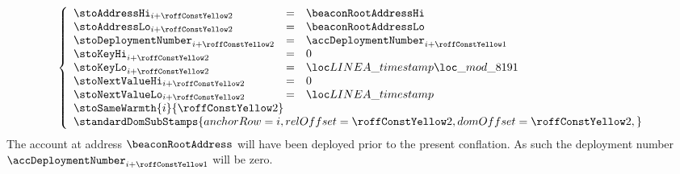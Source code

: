 \item[\underline{\underline{Storing the \inst{TIMESTAMP} in the state:}}]
	\[
		\left\{ \begin{array}{lclr}
			\stoAddressHi        _{i + \roffTxSkipSysiBeaconRootSystemContractStorageSetTimestamp} & = & \beaconRootAddressHi          \\
			\stoAddressLo        _{i + \roffTxSkipSysiBeaconRootSystemContractStorageSetTimestamp} & = & \beaconRootAddressLo          \\
			\stoDeploymentNumber _{i + \roffTxSkipSysiBeaconRootSystemContractStorageSetTimestamp} & = & \accDeploymentNumber          _{i + \roffTxSkipSysiBeaconRootSystemContractAccount} \\
			\stoKeyHi            _{i + \roffTxSkipSysiBeaconRootSystemContractStorageSetTimestamp} & = & 0                             \\
			\stoKeyLo            _{i + \roffTxSkipSysiBeaconRootSystemContractStorageSetTimestamp} & = & \locLineaTimestampModuloPrime \\
			\stoNextValueHi      _{i + \roffTxSkipSysiBeaconRootSystemContractStorageSetTimestamp} & = & 0                             \\
			\stoNextValueLo      _{i + \roffTxSkipSysiBeaconRootSystemContractStorageSetTimestamp} & = & \locLineaTimestamp            \\
			\multicolumn{3}{l}{\stoSameWarmth  {i}{\roffTxSkipSysiBeaconRootSystemContractStorageSetTimestamp} } \\
			\multicolumn{3}{l}{
				\standardDomSubStamps {
					anchorRow = i                                                          ,
					relOffset = \roffTxSkipSysiBeaconRootSystemContractStorageSetTimestamp ,
					domOffset = \roffTxSkipSysiBeaconRootSystemContractStorageSetTimestamp ,
				}} \\
		\end{array} \right.
	\]
	\saNote{} \label{hub: tx skip: sysi: eip 4788: deployment number of system contract}
	The account at address $\beaconRootAddress$ will have been deployed prior to the present conflation.
	As such the deployment number
	$\accDeploymentNumber _{i + \roffTxSkipSysiBeaconRootSystemContractAccount}$
	will be zero.
